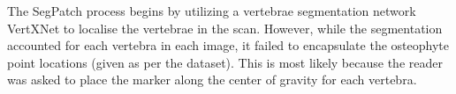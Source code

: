 \documentclass{article}
\newcommand{\rpm}{\raisebox{.2ex}{$\scriptstyle\pm$}}
\begin{document}

The SegPatch process begins by utilizing a vertebrae segmentation network VertXNet \cite{chen2023vertxnet} to localise the vertebrae in the scan. 
However, while the segmentation accounted for each vertebra in each image, it failed to encapsulate the osteophyte point locations (given as per the dataset). 
This is most likely because the reader was asked to place the marker along the center of gravity for each vertebra.
\end{document}
